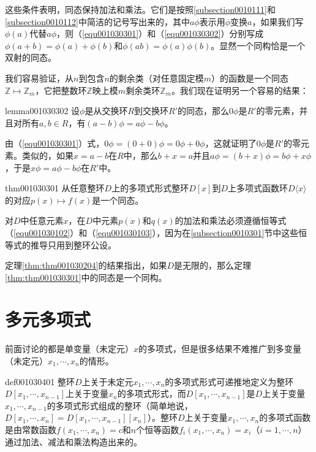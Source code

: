 这些条件表明，同态保持加法和乘法。它们是按照\ref{subsection0010111}和\ref{subsection0010112}中简洁的记号写出来的，其中$a\phi$表示用$\phi$变换$a$，如果我们写$\phi(a)$代替$a\phi$，则（\ref{equ001030301}）和（\ref{equ001030302}）分别写成$\phi(a+b)=\phi(a)+\phi(b)$和$\phi(ab)=\phi(a)\phi(b)$。显然一个同构恰是一个双射的同态。

我们容易验证，从$n$到包含$n$的剩余类（对任意固定模$m$）的函数是一个同态$\mathbb{Z}\mapsto \mathbb{Z}_m$，它把整数环$\mathbb{Z}$映上模$m$剩余类环$\mathbb{Z}_m$。我们现在证明另一个容易的结果：
\begin{lemma}{}{lemma001030302}
设$\phi$是从交换环$R$到交换环$R'$的同态，那么$0\phi$是$R'$的零元素，并且对所有$a, b \in R$，有$(a-b)\phi = a\phi - b\phi$。
\end{lemma}

由（\ref{equ001030301}）式，$0\phi = (0+0)\phi = 0\phi + 0\phi$，这就证明了$0\phi$是$R'$的零元素。类似的，如果$x=a-b$在$R$中，那么$b+x=a$并且$a\phi = (b+x)\phi = b\phi+x\phi$，于是$x\phi = a\phi - b\phi$在$R'$中。

\begin{theorem}{}{thm001030301}
从任意整环$D$上的多项式形式整环$D[x]$到$D$上多项式函数环$D\langle{x}\rangle$的对应$p(x)\mapsto f(x)$是一个同态。
\end{theorem}

对$D$中任意元素$x$，在$D$中元素$p(x)$和$q(x)$的加法和乘法必须遵循恒等式（\ref{equ001030102}）和（\ref{equ001030103}），因为在\ref{subsection0010301}节中这些恒等式的推导只用到整环公设。

定理\ref{thm:thm001030204}的结果指出，如果$D$是无限的，那么定理\ref{thm:thm001030301}中的同态是一个同构。


\section{多元多项式}\label{subsection0010304}
前面讨论的都是单变量（未定元）$x$的多项式，但是很多结果不难推广到多变量（未定元）$x_1, \cdots, x_n$的情形。
\begin{definition}{}{def001030401}
整环$D$上关于未定元$x_1, \cdots, x_n$的多项式形式可递推地定义为整环$D[x_1,\cdots,x_{n-1}]$上关于变量$x_n$的多项式形式，而$D[x_1,\cdots,x_{n-1}]$是$D$上关于变量$x_1,\cdots, x_{n-1}$的多项式形式组成的整环（简单地说，$D[x_1,\cdots, x_n]=D[x_1, \cdots, x_{n-1}][x_n]$）。整环$D$上关于变量$x_1,\cdots, x_n$的多项式函数是由常数函数$f(x_1,\cdots,x_n)=c$和$n$个恒等函数$f_i(x_1,\cdots,x_n)=x_i$（$i=1,\cdots,n$）通过加法、减法和乘法构造出来的。
\end{definition}

